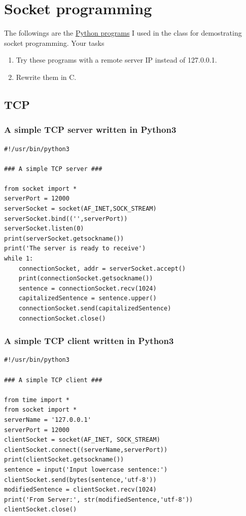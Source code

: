 \documentclass{article}
\begin{document}
\section{Socket programming}
\label{sec:org8a73984}

The followings are the \href{https://cs6.swfu.edu.cn/\~wx672/lecture\_notes/network\_basics/src/}{Python programs} I used in the class for demostrating
socket programming. Your tasks

\begin{enumerate}
\item Try these programs with a remote server IP instead of 127.0.0.1.
\item Rewrite them in C.
\end{enumerate}
\subsection{TCP}
\label{sec:org1cc85c7}

\subsubsection{A simple TCP server written in Python3}
\label{sec:org0db0ba5}

\begin{verbatim}
#!/usr/bin/python3

### A simple TCP server ###

from socket import *
serverPort = 12000
serverSocket = socket(AF_INET,SOCK_STREAM)
serverSocket.bind(('',serverPort))
serverSocket.listen(0)
print(serverSocket.getsockname())
print('The server is ready to receive')
while 1:
    connectionSocket, addr = serverSocket.accept()
    print(connectionSocket.getsockname())
    sentence = connectionSocket.recv(1024)
    capitalizedSentence = sentence.upper()
    connectionSocket.send(capitalizedSentence)
    connectionSocket.close()
\end{verbatim}
\subsubsection{A simple TCP client written in Python3}
\label{sec:orge5e6dca}

\begin{verbatim}
#!/usr/bin/python3

### A simple TCP client ###

from time import *
from socket import *
serverName = '127.0.0.1'
serverPort = 12000
clientSocket = socket(AF_INET, SOCK_STREAM)
clientSocket.connect((serverName,serverPort))
print(clientSocket.getsockname())
sentence = input('Input lowercase sentence:')
clientSocket.send(bytes(sentence,'utf-8'))
modifiedSentence = clientSocket.recv(1024)
print('From Server:', str(modifiedSentence,'utf-8'))
clientSocket.close()
\end{verbatim}
\end{document}
